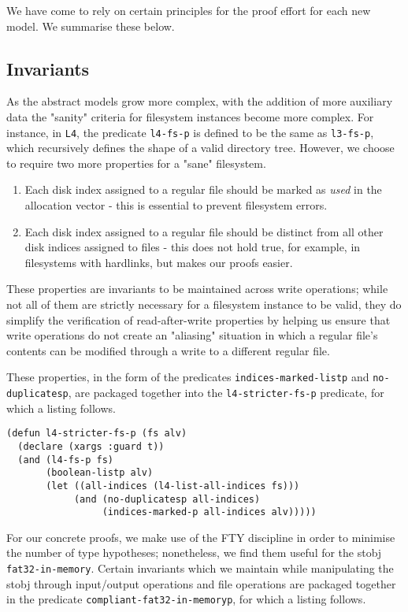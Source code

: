 \documentclass[submission,copyright,creativecommons]{eptcs}
\begin{document}
We have come to rely on certain principles for the proof effort for
each new model. We summarise these below.

\subsection{Invariants}

As the abstract models grow more complex, with the addition of more
auxiliary data the "sanity" criteria for filesystem instances become more
complex. For instance, in \texttt{L4}, the predicate \texttt{l4-fs-p}
is defined to be the same as \texttt{l3-fs-p}, which recursively
defines the shape of a valid directory tree. However, we choose to
require two more properties for a "sane" filesystem.

\begin{enumerate}
\item Each disk index assigned to a regular file should be
  marked as \textit{used} in the allocation vector - this is essential
  to prevent filesystem errors.
\item Each disk index assigned to a regular file should be distinct
  from all other disk indices assigned to files - this does not hold
  true, for example, in filesystems with hardlinks, but makes our
  proofs easier.
\end{enumerate}

These properties are invariants to be maintained across
write operations; while not all of them are strictly necessary for a
filesystem instance to be valid, they do simplify the verification of
read-after-write properties by helping us ensure that write operations
do not create an "aliasing" situation in which a regular file's
contents can be modified through a write to a different regular file.

These properties, in the form of the predicates
\texttt{indices-marked-listp} and \texttt{no-duplicatesp}, are
packaged together into the \texttt{l4-stricter-fs-p} predicate, for
which a listing follows.

\medskip

\noindent
\begin{verbatim}
(defun l4-stricter-fs-p (fs alv)
  (declare (xargs :guard t))
  (and (l4-fs-p fs)
       (boolean-listp alv)
       (let ((all-indices (l4-list-all-indices fs)))
            (and (no-duplicatesp all-indices)
                 (indices-marked-p all-indices alv)))))
\end{verbatim}

For our concrete proofs, we make use of the FTY discipline in order to
minimise the number of type hypotheses; nonetheless, we find them
useful for the stobj \texttt{fat32-in-memory}. Certain invariants
which we maintain while manipulating the stobj through input/output
operations and file operations are packaged together in the predicate
\texttt{compliant-fat32-in-memoryp}, for which a listing follows.
\end{document}
